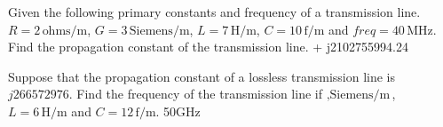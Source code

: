 \begin{mdframed}[backgroundcolor=lightblue, linewidth=1pt, hidealllines=true]
\begin{ExerciseList}
\Exercise[label={ex217}]
 Given the following primary constants and frequency of a transmission line. $R=2\, \text{ohms/m}$, $G=3\, \text{Siemens/m}$, $L=7\, \text{H/m}$, $C=10\, \text{f/m}$ and $freq=40\, \text{MHz}$. Find the propagation constant of the transmission line.
 + j2102755994.24

\Exercise[label={ex217}]
 		 Suppose that the propagation constant of a lossless transmission line is $j266572976$. Find the frequency of the transmission line if $, \text{Siemens/m}$, $L=6\, \text{H/m}$ and $C=12\, \text{f/m}$.
 		 \Answer 50GHz 
\end{ExerciseList}

\end{mdframed}

